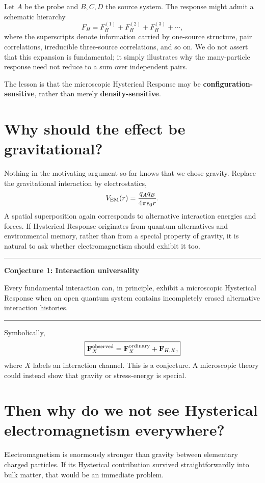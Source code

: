 \documentclass[11pt]{article}
\newenvironment{plainbox}[1]{\begin{center}\begin{minipage}{0.91\textwidth}\hrule\vspace{0.55em}\textbf{#1}\par\smallskip}{\vspace{0.55em}\hrule\end{minipage}\end{center}}
\begin{document}
Let $A$ be the probe and $B,C,D$ the source system. The response might admit a schematic hierarchy
\begin{equation}
F_H=F_H^{(1)}+F_H^{(2)}+F_H^{(3)}+\cdots,
\end{equation}
where the superscripts denote information carried by one-source structure, pair correlations, irreducible three-source correlations, and so on. We do not assert that this expansion is fundamental; it simply illustrates why the many-particle response need not reduce to a sum over independent pairs.

The lesson is that the microscopic Hysterical Response may be \textbf{configuration-sensitive}, rather than merely \textbf{density-sensitive}.

\section{Why should the effect be gravitational?}
Nothing in the motivating argument so far knows that we chose gravity. Replace the gravitational interaction by electrostatics,
\begin{equation}
V_{\rm EM}(r)=\frac{q_Aq_B}{4\pi\epsilon_0r}.
\end{equation}
A spatial superposition again corresponds to alternative interaction energies and forces. If Hysterical Response originates from quantum alternatives and environmental memory, rather than from a special property of gravity, it is natural to ask whether electromagnetism should exhibit it too.

\begin{plainbox}{Conjecture 1: Interaction universality}
Every fundamental interaction can, in principle, exhibit a microscopic Hysterical Response when an open quantum system contains incompletely erased alternative interaction histories.
\end{plainbox}

Symbolically,
\begin{equation}
\boxed{\mathbf F_X^{\rm observed}=\mathbf F_X^{\rm ordinary}+\mathbf F_{H,X},}
\end{equation}
where $X$ labels an interaction channel. This is a conjecture. A microscopic theory could instead show that gravity or stress-energy is special.

\section{Then why do we not see Hysterical electromagnetism everywhere?}
Electromagnetism is enormously stronger than gravity between elementary charged particles. If its Hysterical contribution survived straightforwardly into bulk matter, that would be an immediate problem.
\end{document}
